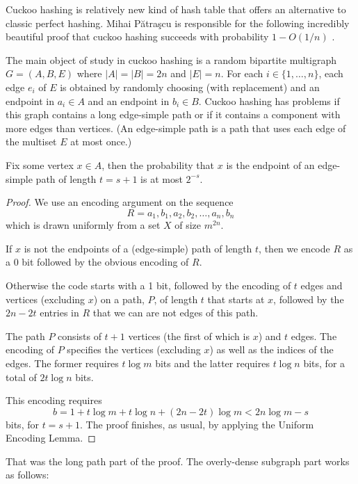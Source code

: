 \documentclass[lotsofwhite]{patmorin}
\begin{document}
Cuckoo hashing is relatively new kind of hash table that offers an
alternative to classic perfect hashing.  Mihai Pătraşcu is responsible
for the following incredibly beautiful proof that cuckoo hashing succeeds
with probability $1-O(1/n)$ \cite{patrascu:cuckoo}.

The main object of study in cuckoo hashing is a random bipartite
multigraph $G=(A,B,E)$ where $|A|=|B|=2n$ and $|E|=n$.  For each
$i\in\{1,\ldots,n\}$, each edge $e_i$ of $E$ is obtained by randomly
choosing (with replacement) and an endpoint in $a_i\in A$ and an endpoint
in $b_i\in B$.  Cuckoo hashing has problems if this graph contains a
long edge-simple path or if it contains a component with more edges
than vertices.  (An edge-simple path is a path that uses each edge of
the multiset $E$ at most once.)

\begin{thm}
  Fix some vertex $x\in A$, then the probability that $x$ is the endpoint
  of an edge-simple path of length $t=s+1$ is at most $2^{-s}$.
\end{thm}

\begin{proof}
  We use an encoding argument on the sequence
  \[
     R=a_1,b_1,a_2,b_2,\ldots,a_n,b_n
  \]
  which is drawn uniformly from a set $X$ of size $m^{2n}$.
  
  If $x$ is not the endpoints of a (edge-simple) path of length $t$,
  then we encode $R$ as a 0 bit followed by the obvious encoding of $R$.

  Otherwise the code starts with a 1 bit, followed by the encoding of
  $t$ edges and vertices (excluding $x$) on a path, $P$, of length $t$ that
  starts at $x$, followed by the $2n-2t$ entries in $R$ that we can are
  not edges of this path.  

  The path $P$ consists of $t+1$ vertices (the first of which is $x$) and
  $t$ edges. The encoding of $P$ specifies the vertices (excluding $x$)
  as well as the indices of the edges. The former requires $t\log m$ bits
  and the latter requires $t\log n$ bits, for a total of $2t\log n$ bits.


This encoding requires
  \[
    b = 1 + t\log m + t\log n + (2n-2t)\log m < 2n\log m - s
  \]
  bits, for $t=s+1$. The proof finishes, as usual, by applying the
  Uniform Encoding Lemma.
\end{proof}

That was the long path part of the proof.  The overly-dense subgraph part works as follows:
\end{document}
